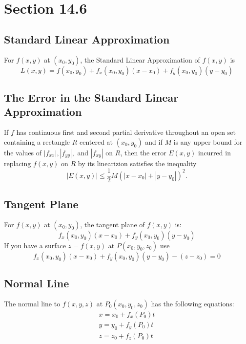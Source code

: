 \documentclass[12pt]{article}
\theoremstyle{break}
\numberwithin{theorem}{subsection}
\numberwithin{lemma}{subsection}
\numberwithin{corollary}{subsection}
\numberwithin{equation}{subsection}
\begin{document}
\section{Section 14.6}

\subsection{Standard Linear Approximation}
For $f(x,y)$ at $(x_0, y_0)$, the Standard Linear Approximation of $f(x,y)$ is 
\begin{equation} 
L(x,y) = f(x_0,y_0) + f_x(x_0,y_0)(x-x_0) + f_y(x_0,y_0)(y-y_0) 
\end{equation}

\subsection{The Error in the Standard Linear Approximation}
If $f$ has continuous first and second partial derivative throughout an open set containing a 
rectangle $R$ centered at $(x_0, y_0)$ and if $M$ is any upper bound for the values of $|f_{xx}|,
|f_{yy}|,$ and $|f_{xy}|$ on $R$, then the error $E(x,y)$ incurred in replacing $f(x,y)$ on $R$ by
its linearizion satisfies the inequality
\begin{equation}
|E(x,y)| \leq \frac12 M(|x-x_0| + |y-y_0|)^2 .
\end{equation}

\subsection{Tangent Plane}
For $f(x,y)$ at $(x_0, y_0)$, the tangent plane of $f(x,y)$ is:
\begin{equation} 
f_x(x_0,y_0)(x-x_0) + f_y(x_0,y_0)(y-y_0) 
\end{equation}
If you have a surface $z = f(x,y)$ at $P(x_0,y_0,z_0)$ use 
\begin{equation}
f_x(x_0,y_0)(x-x_0) + f_y(x_0,y_0)(y-y_0) - (z-z_0) = 0
\end{equation}

\subsection{Normal Line}
The normal line to $f(x,y,z)$ at $P_0 (x_0,y_0,z_0)$ has the following equations:
\begin{align*}
x = x_0 + f_x(P_0)t \\
y = y_0 + f_y(P_0)t \\
z = z_0 + f_z(P_0)t \\
\end{align*}
\end{document}
